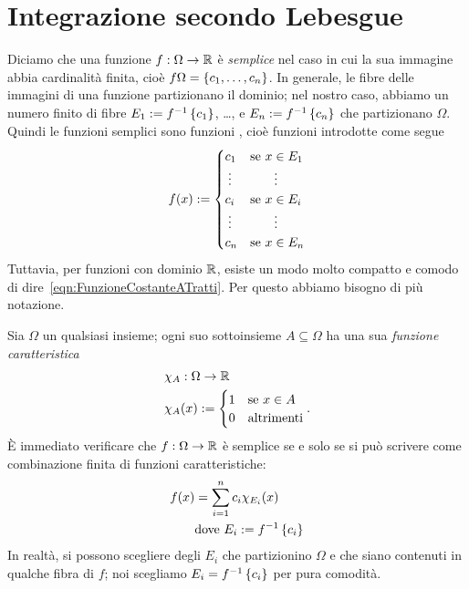 
\section{Integrazione secondo Lebesgue}

Diciamo che una funzione \(f : \Omega \to \mathbb R\) è {\em semplice} nel caso in cui la sua immagine abbia cardinalità finita, cioè \(f \Omega = \left\{c_1, \dots{}, c_n\right\}\). In generale, le fibre delle immagini di una funzione partizionano il dominio; nel nostro caso, abbiamo un numero finito  di fibre \(E_1 := f^{-1}\left\{c_1\right\}\), \dots{}, e \(E_n := f^{-1}\left\{c_n\right\}\) che partizionano \(\Omega\). Quindi le funzioni semplici sono funzioni , cioè funzioni introdotte come segue
\begin{equation}
f(x) := \begin{cases}
c_1 & \text{se } x \in E_1 \\
\mathrel{\makebox[\widthof{\(c_i\)}]{\vdots{}}} & \mathrel{\makebox[\widthof{se \(x \in E_i\)}]{\vdots{}}} \\
c_i & \text{se } x \in E_i \\
\mathrel{\makebox[\widthof{\(c_i\)}]{\vdots{}}} & \mathrel{\makebox[\widthof{se \(x \in E_i\)}]{\vdots{}}} \\
c_n & \text{se } x \in E_n
\end{cases}\label{eqn:FunzioneCostanteATratti}
\end{equation}
Tuttavia, per funzioni con dominio \(\mathbb R\), esiste un modo molto compatto e comodo di dire~\eqref{eqn:FunzioneCostanteATratti}. Per questo abbiamo bisogno di più notazione.

Sia \(\Omega\) un qualsiasi insieme; ogni suo sottoinsieme \(A \subseteq \Omega\) ha una sua {\em funzione caratteristica}
\begin{align*}
& \chi_A : \Omega \to \mathbb R \\
& \chi_A(x) := \begin{cases} 1 & \text{se } x \in A \\ 0 & \text{altrimenti} \end{cases}.
\end{align*}
%
È immediato verificare che \(f : \Omega \to \mathbb R\) è semplice se e solo se si può scrivere come combinazione finita di funzioni caratteristiche:
\begin{align*}
f(x) &= \sum_{i=1}^n c_i\chi_{E_i}(x) \\
& \text{dove } E_i := f^{-1}\left\{c_i\right\}
\end{align*}
In realtà, si possono scegliere degli \(E_i\) che partizionino \(\Omega\) e che siano contenuti in qualche fibra di \(f\); noi scegliamo \(E_i = f^{-1}\left\{c_i\right\}\) per pura comodità.

